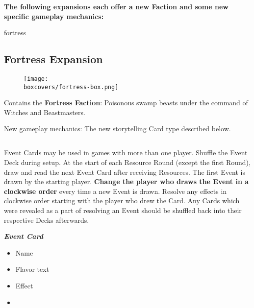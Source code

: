 \textbf{The following expansions each offer a new Faction and some new specific gameplay mechanics:}
\begin{multicols}{2}
\begin{expansion}[title=]{fortress}
  \subsection*{\color{fortress}Fortress Expansion}
  \setlength\intextsep{0pt}
  \setlength\columnsep{0.8em}
  \begin{wrapfigure}{l}{0.35\textwidth}
      \texttt{[image: \\boxcovers/fortress-box.png]}
  \end{wrapfigure}
  Contains the \textbf{Fortress Faction}: Poisonous swamp beasts under the command of Witches and Beastmasters.\par
  \medskip
  New gameplay mechanics: The new storytelling Card type described below.
  \medskip
  \subsection*{}
  Event Cards may be used in games with more than one player.
  Shuffle the Event Deck during setup.
  At the start of each Resource Round (except the first Round), draw and read the next Event Card after receiving Resources.
  The first Event is drawn by the starting player.
  \textbf{Change the player who draws the Event in a clockwise order} every time a new Event is drawn.
  Resolve any effects in clockwise order starting with the player who drew the Card.
  Any Cards which were revealed as a part of resolving an Event should be shuffled back into their respective Decks afterwards.

  \medskip

  \begin{minipage}[h]{\linewidth}
  \vspace{0.1pt}
  \centering
  \begin{scriptsize}
  \end{scriptsize}
  \footnotesize
  \textbf{\textit{\textcolor{darkcandyapplered}{Event Card}}}
  \begin{multicols}{2}
    \begin{itemize}
    \item[\textbf{1.}] Name
    \item[\textbf{2.}] Flavor text
    \item[\textbf{3.}] Effect
    \item[\textbf{\phantom{.}}] \phantom{.}
    \end{itemize}
  \end{multicols}
  \end{minipage}
\end{expansion}


\end{multicols}
